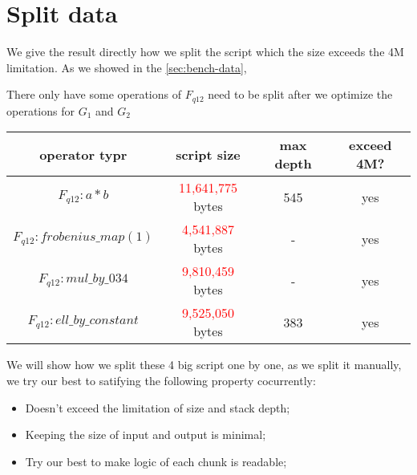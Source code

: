 \section{Split data} \label{sec:split-data}

We give the result directly how we split the script which the size exceeds the 4M limitation. As we showed in the \ref{sec:bench-data},

There only have some operations of $F_{q12}$ need to be split after we optimize the operations for $G_1$ and $G_2$

\begin{tabular}{|c|c|c|c|} \hline
    operator typr & script size & max depth & exceed 4M? \\ \hline
    $F_{q12}: a * b$ & \textcolor{red}{11,641,775} bytes & 545 & yes \\ \hline
    $F_{q12}: frobenius\_map(1)$ & \textcolor{red}{4,541,887} bytes & - & yes \\ \hline
    $F_{q12}: mul\_by\_034$ & \textcolor{red}{9,810,459} bytes & - & yes \\ \hline
    $F_{q12}: ell\_by\_constant$ & \textcolor{red}{9,525,050} bytes & 383 & yes \\ \hline    
\end{tabular}


We will show how we split these 4 big script one by one, as we split it manually, we try our best to satifying the following property cocurrently:

\begin{itemize}
    \item Doesn't exceed the limitation of size and stack depth;
    \item Keeping the size of input and output is minimal;
    \item Try our best to make logic of each chunk is readable; 
\end{itemize}




